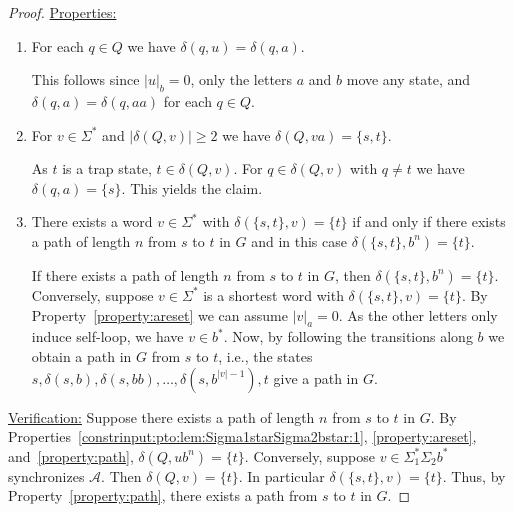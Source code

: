 \begin{proof}
	\medskip 
	\noindent\underline{Properties:} 
	\begin{enumerate}
		
		\item \label{constrinput:pto:lem:Sigma1starSigma2bstar:1} For each $q \in Q$ we have $\delta(q, u) = \delta(q, a)$.
		
		This follows since $|u|_b = 0$, only the letters $a$ and $b$
		move any state, and $\delta(q, a) = \delta(q, aa)$ for each $q \in Q$.		
		
		\item \label{property:areset} For $v \in \Sigma^*$ and $|\delta(Q, v)| \ge 2$
		we have $\delta(Q, va) = \{s,t\}$.
		
		As $t$ is a trap state, $t \in \delta(Q, v)$.
		For $q \in \delta(Q, v)$ with $q \ne t$	we have $\delta(q, a) = \{s\}$.	This yields the claim.		
		
		\item \label{property:path}There exists a word $v \in \Sigma^*$
		with $\delta(\{s,t\}, v) = \{t\}$ if and only if there exists a path of length $n$ from $s$ to $t$
		in $G$ and in this case $\delta(\{s,t\}, b^n) = \{t\}$.
		
		If there exists a path of length $n$ from $s$ to $t$ in $G$,
		then $\delta(\{s,t\}, b^n) = \{t\}$.
		Conversely, suppose $v \in \Sigma^*$ is a shortest word with $\delta(\{s,t\}, v) = \{t\}$.
		By Property~\ref{property:areset} 
		we can assume $|v|_a = 0$. As the other letters only induce
		self-loop, we have $v \in b^*$.
		Now, by following the transitions along $b$ we obtain a path in $G$ from $s$ to $t$, i.e.,
		the states $s, \delta(s, b), \delta(s, bb), \ldots, \delta(s, b^{|v|-1}), t$
		give a path in $G$.		
	\end{enumerate}
	
	\noindent\underline{Verification:} Suppose there exists
	a path of length $n$ from $s$ to $t$ in $G$.
	By Properties~\ref{constrinput:pto:lem:Sigma1starSigma2bstar:1}, \ref{property:areset},
	and~\ref{property:path}, $\delta(Q, ub^n) = \{t\}$.	
	Conversely, suppose $v \in \Sigma_{1}^* \Sigma_{2} b^*$ 
	synchronizes $\mathcal A$. 
	Then $\delta(Q, v) = \{t\}$.
	In particular $\delta(\{s,t\}, v) = \{t\}$. Thus, by Property~\ref{property:path},
	there exists a path from $s$ to $t$ in $G$. 
\end{proof}

